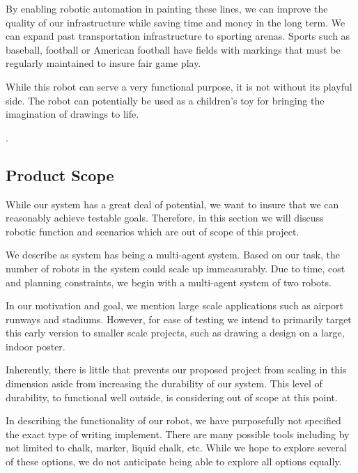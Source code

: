 By enabling robotic automation in painting these lines, we can improve the quality of our infrastructure while saving time and money in the long term. We can expand past transportation infrastructure to sporting arenas. Sports such as baseball, football or American football have fields with markings that must be regularly maintained to insure fair game play. 

While this robot can serve a very functional purpose, it is not without its playful side. The robot can potentially be used as a children's toy for bringing the imagination of drawings to life. 

.

\subsection{Product Scope}
\label{sec:project_scope}
While our  system has a great deal of potential, we want to insure that we can reasonably achieve testable goals. Therefore, in this section we will discuss robotic function and scenarios which are out of scope of this project. 

We describe as system has being a multi-agent system. Based on our task, the number of robots in the system could scale up immeasurably. Due to time, cost and planning constraints, we begin with a multi-agent system of two  robots. 

In our motivation and goal, we mention large scale applications such as airport runways and stadiums. However, for ease of testing we intend to primarily target this early version to smaller scale projects, such as drawing a design on a large, indoor poster. 

Inherently, there is little that prevents our proposed project from scaling in this dimension aside from increasing the durability of our system. This level of durability, to functional well outside, is considering out of scope at this point. 

In describing the functionality of our robot, we have purposefully not specified the exact type of writing implement. There are many possible tools including by not limited to chalk,  marker, liquid chalk, etc. While we hope to explore several of these options, we do not anticipate being able to explore all options equally. 

